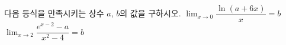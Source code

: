 다음 등식을 만족시키는 상수 $a$, $b$의 값을 구하시오.
 $\displaystyle\lim_{x\to 0}\dfrac{\ln(a+6x)}{x}=b$
 $\displaystyle\lim_{x\to 2}\dfrac{e^{x-2}-a}{x^2-4}=b$
